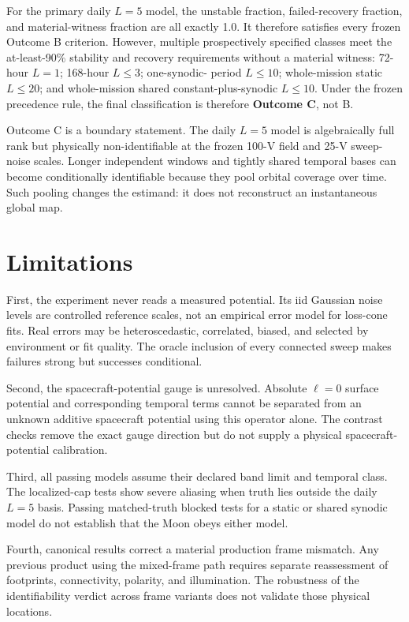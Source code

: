 \documentclass[11pt]{article}
\begin{document}
For the primary daily $L=5$ model, the unstable fraction, failed-recovery
fraction, and material-witness fraction are all exactly 1.0.  It therefore
satisfies every frozen Outcome B criterion.  However, multiple prospectively
specified classes meet the at-least-90\% stability and recovery requirements
without a material witness: 72-hour $L=1$; 168-hour $L\leq3$; one-synodic-
period $L\leq10$; whole-mission static $L\leq20$; and whole-mission shared
constant-plus-synodic $L\leq10$.  Under the frozen precedence rule, the final
classification is therefore \textbf{Outcome C}, not B.

Outcome C is a boundary statement.  The daily $L=5$ model is algebraically
full rank but physically non-identifiable at the frozen 100-V field and 25-V
sweep-noise scales.  Longer independent windows and tightly shared temporal
bases can become conditionally identifiable because they pool orbital coverage
over time.  Such pooling changes the estimand: it does not reconstruct an
instantaneous global map.

\section{Limitations}

First, the experiment never reads a measured potential.  Its iid Gaussian
noise levels are controlled reference scales, not an empirical error model for
loss-cone fits.  Real errors may be heteroscedastic, correlated, biased, and
selected by environment or fit quality.  The oracle inclusion of every
connected sweep makes failures strong but successes conditional.

Second, the spacecraft-potential gauge is unresolved.  Absolute $\ell=0$
surface potential and corresponding temporal terms cannot be separated from
an unknown additive spacecraft potential using this operator alone.  The
contrast checks remove the exact gauge direction but do not supply a physical
spacecraft-potential calibration.

Third, all passing models assume their declared band limit and temporal class.
The localized-cap tests show severe aliasing when truth lies outside the daily
$L=5$ basis.  Passing matched-truth blocked tests for a static or shared
synodic model do not establish that the Moon obeys either model.

Fourth, canonical results correct a material production frame mismatch.  Any
previous product using the mixed-frame path requires separate reassessment of
footprints, connectivity, polarity, and illumination.  The robustness of the
identifiability verdict across frame variants does not validate those physical
locations.
\end{document}

